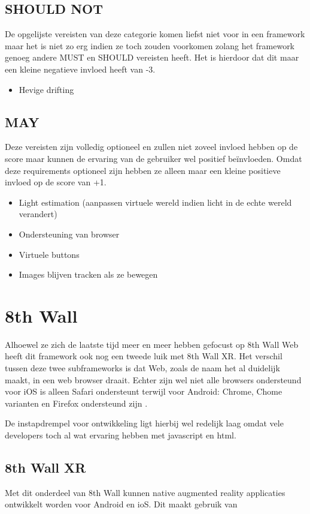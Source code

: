 \subsection{SHOULD NOT}
De opgelijste vereisten van deze categorie komen liefst niet voor in een framework maar het is niet zo erg indien ze toch zouden voorkomen zolang het framework genoeg andere MUST en SHOULD vereisten heeft. Het is hierdoor dat dit maar een kleine negatieve invloed heeft van -3.
\begin{itemize}
    \item Hevige drifting
\end{itemize} 

\subsection{MAY}
Deze vereisten zijn volledig optioneel en zullen niet zoveel invloed hebben op de score maar kunnen de ervaring van de gebruiker wel positief beïnvloeden. Omdat deze requirements optioneel zijn hebben ze alleen maar een kleine positieve invloed op de score van +1.
\begin{itemize}
    \item Light estimation (aanpassen virtuele wereld indien licht in de echte wereld verandert)
    \item Ondersteuning van browser
     \item Virtuele buttons
     \item Images blijven tracken als ze bewegen
\end{itemize} 

\section{8th Wall}
Alhoewel ze zich de laatste tijd meer en meer hebben gefocust op 8th Wall Web heeft dit framework ook nog een tweede luik met 8th Wall XR. Het verschil tussen deze twee subframeworks is dat Web, zoals de naam het al duidelijk maakt, in een web browser draait. Echter zijn wel niet alle browsers ondersteund voor iOS is alleen Safari ondersteunt terwijl voor Android: Chrome, Chome varianten en Firefox ondersteund zijn \autocite{8thWallWebReq}.

De instapdrempel voor ontwikkeling ligt hierbij wel redelijk laag omdat vele developers toch al wat ervaring hebben met javascript en html.

\subsection{8th Wall XR}
Met dit onderdeel van 8th Wall kunnen native augmented reality applicaties ontwikkelt worden voor Android en ioS. Dit maakt gebruik van



